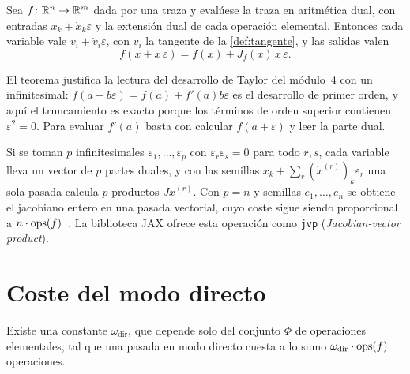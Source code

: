 \begin{teorema}\label{teo:duales}
Sea $f\colon\mathbb{R}^{n}\to\mathbb{R}^{m}$ dada por una traza y evalúese la traza en aritmética dual, con entradas $x_k+\dot x_k\varepsilon$ y la extensión dual de cada operación elemental. Entonces cada variable vale $v_i+\dot v_i\varepsilon$, con $\dot v_i$ la tangente de la \cref{def:tangente}, y las salidas valen
\[
f(x+\dot x\,\varepsilon)=f(x)+J_f(x)\,\dot x\,\varepsilon .
\]
\end{teorema}

El teorema justifica la lectura del desarrollo de Taylor del módulo~4 con un infinitesimal: $f(a+b\varepsilon)=f(a)+f'(a)b\varepsilon$ es el desarrollo de primer orden, y aquí el truncamiento es exacto porque los términos de orden superior contienen $\varepsilon^{2}=0$. Para evaluar $f'(a)$ basta con calcular $f(a+\varepsilon)$ y leer la parte dual.

\addtocounter{definicion}{1}%

\begin{observacion}\label{obs:multidual}
Si se toman $p$ infinitesimales $\varepsilon_1,\dots,\varepsilon_p$ con $\varepsilon_r\varepsilon_s=0$ para todo $r,s$, cada variable lleva un vector de $p$ partes duales, y con las semillas $x_k+\sum_r(\dot x^{(r)})_k\varepsilon_r$ una sola pasada calcula $p$ productos $J\dot x^{(r)}$. Con $p=n$ y semillas $e_1,\dots,e_n$ se obtiene el jacobiano entero en una pasada vectorial, cuyo coste sigue siendo proporcional a $n\cdot\operatorname{ops}(f)$~\cite{mit18337}. La biblioteca JAX ofrece esta operación como \texttt{jvp} (\emph{Jacobian-vector product}).
\end{observacion}

\section{Coste del modo directo}

\begin{proposicion}\label{prop:coste-dual}
Existe una constante $\omega_{\mathrm{dir}}$, que depende solo del conjunto $\Phi$ de operaciones elementales, tal que una pasada en modo directo cuesta a lo sumo $\omega_{\mathrm{dir}}\cdot\operatorname{ops}(f)$ operaciones.
\end{proposicion}

\addtocounter{definicion}{1}%

